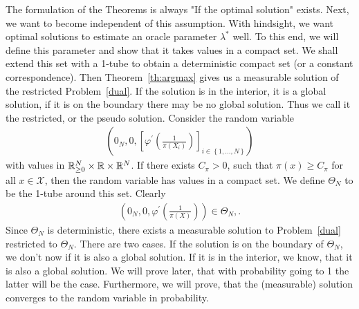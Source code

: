 The formulation of the Theorems is always "If the optimal solution" exists.
Next, we want to become independent of this assumption.
With hindsight, we want optimal solutions to estimate an oracle parameter $\lambda^*$ well. 
To this end, we will define this parameter and show that it takes values in a compact set.
We shall extend this set with a 1-tube to obtain a deterministic compact set (or a constant correspondence).
Then Theorem~\ref{th:argmax} gives us a measurable solution of the restricted Problem~\ref{dual}.
If the solution is in the interior, it is a global solution, if it is on the boundary there may be no global solution.
Thus we call it the restricted, or the pseudo solution.
Consider 
the random variable
\begin{align*}
  \left(
  0_{N},0,
  \left[
  \varphi^{'}
  \left(
  \frac
  {1}
  {\pi(X_i)}
  \right)
\right]_{i\in \left\{
  1,\ldots,N
\right\}}
  \right)
\end{align*}
with values in $\mathbb{R}^N_{\ge 0}\times \mathbb{R}\times \mathbb{R}^N$.
If there exists $C_{\pi}>0$, such that $\pi(x)\ge C_\pi$ for all $x\in\mathcal{X}$, 
then 
the random variable has values in a compact set. 
We define $\Theta_N$ to be the 1-tube around this set. 
Clearly
\begin{align*}
  \left(
  0_{N},0,
  \varphi^{'}
  \left(
  \frac
  {1}
  {\pi(X)}
  \right)
  \right)
  \in 
  \Theta_N
  ,.
\end{align*}
Since $\Theta_N$ is deterministic, there exists a measurable solution to Problem~\ref{dual} restricted to $\Theta_N$.
There are two cases. If the solution is on the boundary of $\Theta_N$, we don't now if it is also a global solution.
If it is in the interior, we know, that it is also a global solution.
We will prove later, that with probability going to 1 the latter will be the case.
Furthermore, we will prove, that the (measurable) solution converges to the random variable in probability.
